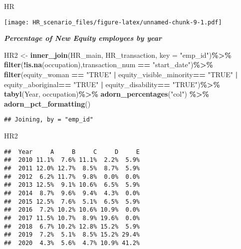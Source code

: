 \documentclass[
]{article}
\newenvironment{Shaded}{\begin{snugshade}}{\end{snugshade}}
\newcommand{\DataTypeTok}[1]{\textcolor[rgb]{0.13,0.29,0.53}{#1}}
\newcommand{\KeywordTok}[1]{\textcolor[rgb]{0.13,0.29,0.53}{\textbf{#1}}}
\newcommand{\NormalTok}[1]{#1}
\newcommand{\OperatorTok}[1]{\textcolor[rgb]{0.81,0.36,0.00}{\textbf{#1}}}
\newcommand{\StringTok}[1]{\textcolor[rgb]{0.31,0.60,0.02}{#1}}
\begin{document}
\begin{Shaded}
\begin{Highlighting}[]
\NormalTok{HR}
\end{Highlighting}
\end{Shaded}

\texttt{[image: HR\_scenario\_files/figure-latex/unnamed-chunk-9-1.pdf]}

\textbf{\emph{Percentage of New Equity employees by year}}

\begin{Shaded}
\begin{Highlighting}[]
\NormalTok{HR2 \textless{}{-}}\StringTok{ }\KeywordTok{inner\_join}\NormalTok{(HR\_main, HR\_transaction, }\DataTypeTok{key =} \StringTok{"emp\_id"}\NormalTok{)}\OperatorTok{\%\textgreater{}\%}
\KeywordTok{filter}\NormalTok{(}\OperatorTok{!}\KeywordTok{is.na}\NormalTok{(occupation),transaction\_num }\OperatorTok{==}\StringTok{ "start\_date"}\NormalTok{)}\OperatorTok{\%\textgreater{}\%}
\StringTok{  }\KeywordTok{filter}\NormalTok{(equity\_woman }\OperatorTok{==}\StringTok{ "TRUE"} \OperatorTok{|}\StringTok{ }\NormalTok{equity\_visible\_minority}\OperatorTok{==}\StringTok{ "TRUE"} \OperatorTok{|}\StringTok{ }\NormalTok{equity\_aboriginal}\OperatorTok{==}\StringTok{ "TRUE"} \OperatorTok{|}\StringTok{ }\NormalTok{equity\_disability}\OperatorTok{==}\StringTok{ "TRUE"}\NormalTok{)}\OperatorTok{\%\textgreater{}\%}
\StringTok{  }\KeywordTok{tabyl}\NormalTok{(Year, occupation)}\OperatorTok{\%\textgreater{}\%}
\StringTok{  }\KeywordTok{adorn\_percentages}\NormalTok{(}\StringTok{"col"}\NormalTok{) }\OperatorTok{\%\textgreater{}\%}
\StringTok{  }\KeywordTok{adorn\_pct\_formatting}\NormalTok{()}
\end{Highlighting}
\end{Shaded}

\begin{verbatim}
## Joining, by = "emp_id"
\end{verbatim}

\begin{Shaded}
\begin{Highlighting}[]
\NormalTok{HR2}
\end{Highlighting}
\end{Shaded}

\begin{verbatim}
##  Year     A     B     C     D     E
##  2010 11.1%  7.6% 11.1%  2.2%  5.9%
##  2011 12.0% 12.7%  8.5%  8.7%  5.9%
##  2012  6.2% 11.7%  9.8%  0.0%  0.0%
##  2013 12.5%  9.1% 10.6%  6.5%  5.9%
##  2014  8.7%  9.6%  9.4%  4.3%  0.0%
##  2015 12.5%  7.6%  5.1%  6.5%  5.9%
##  2016  7.2% 10.2% 10.6% 10.9%  0.0%
##  2017 11.5% 10.7%  8.9% 19.6%  0.0%
##  2018  6.7% 10.2% 12.8% 15.2%  5.9%
##  2019  7.2%  5.1%  8.5% 15.2% 29.4%
##  2020  4.3%  5.6%  4.7% 10.9% 41.2%
\end{verbatim}
\end{document}
